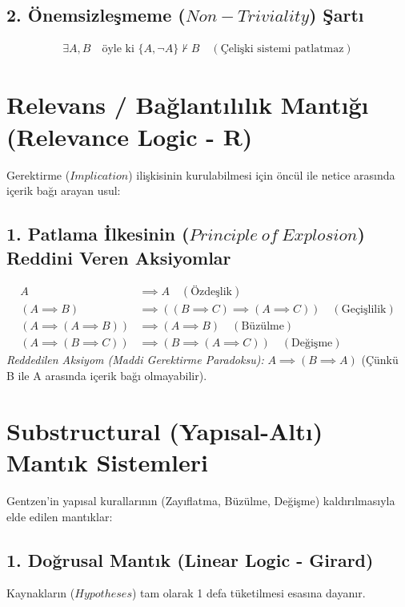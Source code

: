 \documentclass[11pt, a4paper]{article}
\begin{document}
\subsection{2. Önemsizleşmeme ($Non-Triviality$) Şartı}
\begin{align}
\exists A, B \quad \text{öyle ki } \{A, \neg A\} \nvdash B \quad (\text{Çelişki sistemi patlatmaz})
\end{align}

\section{Relevans / Bağlantılılık Mantığı (Relevance Logic - $\mathbf{R}$)}

Gerektirme ($Implication$) ilişkisinin kurulabilmesi için öncül ile netice arasında içerik bağı arayan usul:

\subsection{1. Patlama İlkesinin ($Principle\ of\ Explosion$) Reddini Veren Aksiyomlar}
\begin{align}
A &\implies A \quad (\text{Özdeşlik}) \\
(A \implies B) &\implies ((B \implies C) \implies (A \implies C)) \quad (\text{Geçişlilik}) \\
(A \implies (A \implies B)) &\implies (A \implies B) \quad (\text{Büzülme}) \\
(A \implies (B \implies C)) &\implies (B \implies (A \implies C)) \quad (\text{Değişme})
\end{align}
\textit{Reddedilen Aksiyom (Maddi Gerektirme Paradoksu):} $A \implies (B \implies A)$ (Çünkü B ile A arasında içerik bağı olmayabilir).

\section{Substructural (Yapısal-Altı) Mantık Sistemleri}

Gentzen'in yapısal kurallarının (Zayıflatma, Büzülme, Değişme) kaldırılmasıyla elde edilen mantıklar:

\subsection{1. Doğrusal Mantık (Linear Logic - Girard)}
Kaynakların ($Hypotheses$) tam olarak 1 defa tüketilmesi esasına dayanır.
\end{document}
